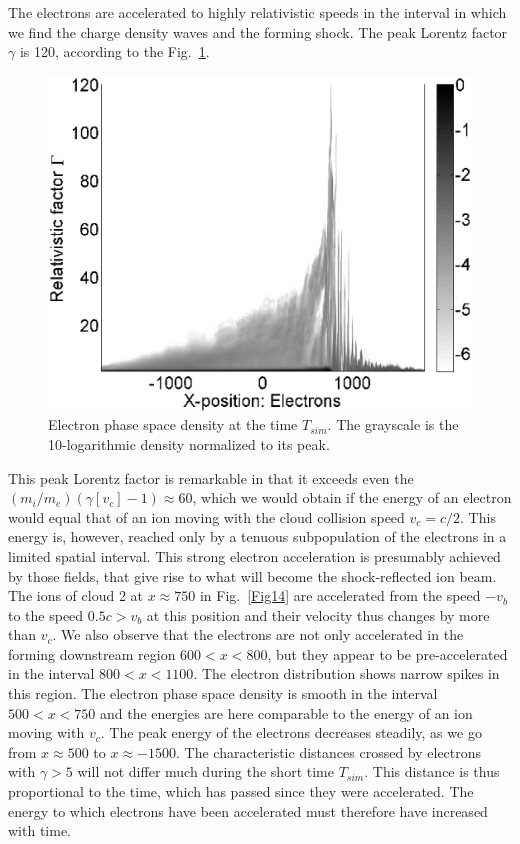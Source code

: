 \documentclass[structabstract]{aa}
\begin{document}
The electrons are accelerated to highly relativistic speeds in the interval
in which we find the charge density waves and the forming shock. The peak 
Lorentz factor $\gamma$ is 120, according to the Fig.~\ref{Fig15}.
\begin{figure}
\centering
\includegraphics[width=\columnwidth]{Fig15.eps}
\caption{Electron phase space density at the time $T_{sim}$. The grayscale 
is the 10-logarithmic density normalized to its peak.}
\label{Fig15}
\end{figure}
This peak Lorentz factor is remarkable in that it exceeds even the $(m_i/m_e) 
(\gamma [v_c] -1) \approx 60$, which we would obtain if the energy of an 
electron would equal that of an ion moving with the cloud collision speed 
$v_c = c/2$. This energy is, however, reached only by a tenuous subpopulation 
of the electrons in a limited spatial interval. This strong electron 
acceleration is presumably achieved by those fields, that give rise to 
what will become the shock-reflected ion beam. The ions of cloud 2 at 
$x\approx 750$ in Fig.~\ref{Fig14} are accelerated from the speed $-v_b$
to the speed $0.5c>v_b$ at this position and their velocity thus changes by
more than $v_c$. We also observe that the electrons are not only accelerated 
in the forming downstream region $600 < x < 800$, but they appear to be 
pre-accelerated in the interval $800<x<1100$. The electron distribution 
shows narrow spikes in this region. The electron phase space density is 
smooth in the interval $500 < x < 750$ and the energies are here comparable 
to the energy of an ion moving with $v_c$. The peak energy of the electrons 
decreases steadily, as we go from $x\approx 500$ to $x\approx -1500$. The 
characteristic distances crossed by electrons with $\gamma > 5$ will 
not differ much during the short time $T_{sim}$. This distance is thus 
proportional to the time, which has passed since they were accelerated. The 
energy to which electrons have been accelerated must therefore have increased with time.
\end{document}
